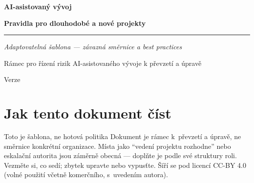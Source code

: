 




\thispagestyle{empty}
\vspace*{3cm}
{\sffamily\fontsize{30}{34}\selectfont\bfseries\color{navy}AI-asistovaný vývoj\par}
\vspace{4pt}
{\sffamily\Large\bfseries\color{blue}Pravidla pro dlouhodobé a nové projekty\par}
\vspace{10pt}
{\color{blue}\rule{\linewidth}{1.5pt}}\par
\vspace{12pt}
{\sffamily\large\itshape\color{black!55}Adaptovatelná šablona --- závazná směrnice a best practices\par}
\vspace{20pt}
{\sffamily\small\color{black!50}
Rámec pro řízení rizik AI-asistovaného vývoje k převzetí a úpravě\par
\vspace{2pt}
Verze \versionline\par}
\vfill
\newpage

\tableofcontents
\newpage

\section{Jak tento dokument číst}

\begin{callout}[amber]{Toto je šablona, ne hotová politika}
Dokument je rámec k~převzetí a úpravě, ne směrnice konkrétní organizace.
Místa jako \enquote{vedení projektu rozhodne} nebo eskalační autorita jsou záměrně obecná --- doplňte je podle své struktury roli.
Vezměte si, co sedí; zbytek upravte nebo vypusťte.
Šíří se pod licencí CC-BY 4.0 (volné použití včetně komerčního, s~uvedením autora).
\end{callout}

